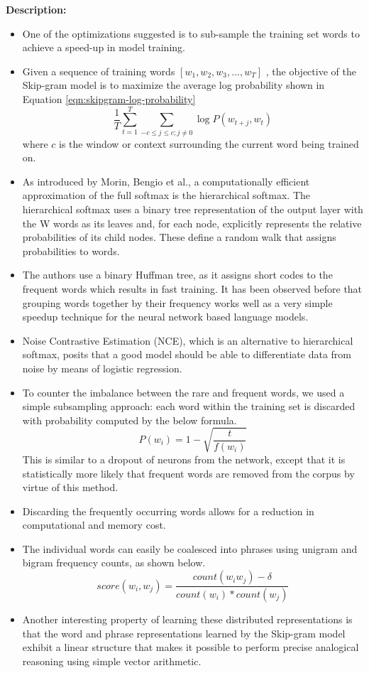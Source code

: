 \documentclass[11pt,a4paper]{article}
\begin{document}
  \textbf{Description:}
  \begin{itemize}
    \item
    One of the optimizations suggested is to sub-sample the training set words to achieve a speed-up in model training.
    \item
    Given a sequence of training words $[w_1 , w_2 , w_3 , ... , w_T]$ , the objective of the Skip-gram model is to maximize the average log probability shown in Equation \ref{eqn:skipgram-log-probability}
    \begin{equation} \label{eqn:skipgram-log-probability}
      \frac{1}{T} \sum_{t=1}^T \sum_{-c \leq j \leq c; j \neq 0} \log P(w_{t+j}, w_t)
    \end{equation}
    where $c$ is the window or context surrounding the current word being trained on.
    \item
    As introduced by Morin, Bengio et al.\cite{morin2005hierarchical}, a computationally efficient approximation of the full softmax is the hierarchical softmax. The hierarchical softmax uses a binary tree representation of the output layer with the W words as its leaves and, for each node, explicitly represents the relative probabilities of its child nodes. These define a random walk that assigns probabilities to words.
    \item
    The authors use a binary Huffman tree, as it assigns short codes to the frequent words which results in fast training. It has been observed before that grouping words together by their frequency works well as a very simple speedup technique for the neural network based language models.
    \item
    Noise Contrastive Estimation (NCE), which is an alternative to hierarchical softmax,  posits that a good model should be able to differentiate data from noise by means of logistic regression.
    \item
    To counter the imbalance between the rare and frequent words, we used a simple subsampling approach: each word within the training set is discarded with probability computed by the below formula.
    $$P(w_i) = 1 - \sqrt{\frac{t}{f(w_i)}} $$
    This is similar to a dropout of neurons from the network, except that it is statistically more likely that frequent words are removed from the corpus by virtue of this method.
    \item
    Discarding the frequently occurring words allows for a reduction in computational and memory cost.
    \item
    The individual words can easily be coalesced into phrases using unigram and bigram frequency counts, as shown below.
    $$score(w_i, w_j) = \frac{count(w_i w_j) - \delta}{count(w_i) * count(w_j)} $$
    \item
    Another interesting property of learning these distributed representations is that the word and phrase representations learned by the Skip-gram model exhibit a linear structure that makes it possible to perform precise analogical reasoning using simple vector arithmetic.
  \end{itemize}
\end{document}
